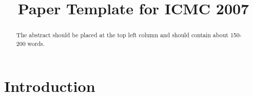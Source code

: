 \documentclass{article}
\title{Paper Template for ICMC 2007}
\begin{document}
\maketitle

\begin{abstract}
The abstract should be placed at the top left column and should contain
about 150-200 words.
\end{abstract}

\section{Introduction}
\label{sec:introduction}



\end{document}
